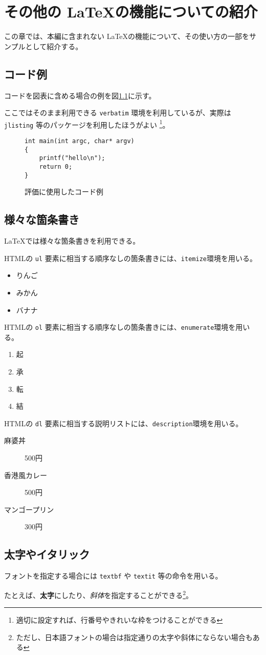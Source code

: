 \chapter{その他の \LaTeX の機能についての紹介}
この章では、本編に含まれない \LaTeX の機能について、その使い方の一部をサンプルとして紹介する。

\section{コード例}
コードを図表に含める場合の例を図\ref{eval_code}に示す。

ここではそのまま利用できる \verb|verbatim| 環境を利用しているが、実際は \verb|jlisting| 等のパッケージを利用したほうがよい
\footnote{適切に設定すれば、行番号やきれいな枠をつけることができる}。

\begin{figure}[tb]
  \begin{screen}
    \begin{verbatim}int main(int argc, char* argv)
{
    printf("hello\n");
    return 0;
}\end{verbatim}
  \end{screen}
  \caption{評価に使用したコード例}
  \label{eval_code}
\end{figure}

\section{様々な箇条書き}
\LaTeX では様々な箇条書きを利用できる。

HTMLの \verb|ul| 要素に相当する順序なしの箇条書きには、\verb|itemize|環境を用いる。

\begin{itemize}
    \item りんご
    \item みかん
    \item バナナ
\end{itemize}

HTMLの \verb|ol| 要素に相当する順序なしの箇条書きには、\verb|enumerate|環境を用いる。

\begin{enumerate}
    \item 起
    \item 承
    \item 転
    \item 結
\end{enumerate}

HTMLの \verb|dl| 要素に相当する説明リストには、\verb|description|環境を用いる。

\begin{description}
    \item[麻婆丼] 500円
    \item[香港風カレー] 500円
    \item[マンゴープリン] 300円
\end{description}

\section{太字やイタリック}
フォントを指定する場合には \verb|textbf| や \verb|textit| 等の命令を用いる。

たとえば、\textbf{太字}にしたり、\textit{斜体}を指定することができる\footnote{ただし、日本語フォントの場合は指定通りの太字や斜体にならない場合もある}。
